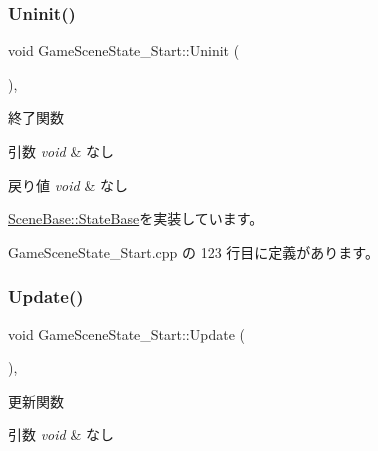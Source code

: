 \subsubsection{\texorpdfstring{Uninit()}{Uninit()}}
{\footnotesize\ttfamily void Game\+Scene\+State\+\_\+\+Start\+::\+Uninit (\begin{DoxyParamCaption}{ }\end{DoxyParamCaption})\hspace{0.3cm}{\ttfamily [override]}, {\ttfamily [virtual]}}



終了関数 


\begin{DoxyParams}{引数}
{\em void} & なし \\
\hline
\end{DoxyParams}

\begin{DoxyRetVals}{戻り値}
{\em void} & なし \\
\hline
\end{DoxyRetVals}


\mbox{\hyperlink{class_scene_base_1_1_state_base_a2763fa37e45b39bd8d3bbb735c76c59b}{Scene\+Base\+::\+State\+Base}}を実装しています。



 Game\+Scene\+State\+\_\+\+Start.\+cpp の 123 行目に定義があります。

\mbox{\label{class_game_scene_state___start_ae11bb8d8ea9eae4fea2a9acf33dd1c8b}} 
\subsubsection{\texorpdfstring{Update()}{Update()}}
{\footnotesize\ttfamily void Game\+Scene\+State\+\_\+\+Start\+::\+Update (\begin{DoxyParamCaption}{ }\end{DoxyParamCaption})\hspace{0.3cm}{\ttfamily [override]}, {\ttfamily [virtual]}}



更新関数 


\begin{DoxyParams}{引数}
{\em void} & なし \\
\hline
\end{DoxyParams}

